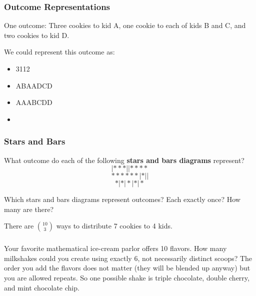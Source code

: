 \documentclass[11pt, compress]{beamer}
\newcommand{\terminology}[1]{\textbf{#1}}
\begin{document}
\begin{frame}
\frametitle{Outcome Representations}
 One outcome: Three cookies to kid A, one cookie to each of kids B and C, and two cookies to kid D.
 
\pause \vfill 

We could represent this outcome as:
\pause 

\begin{itemize}[<+->]
\item{} 3112


\item{} ABAADCD


\item{} AAABCDD


\item{} \textasteriskcentered{}\textasteriskcentered{}\textasteriskcentered{}\textbar{}\textasteriskcentered{}\textbar{}\textasteriskcentered{}\textbar{}\textasteriskcentered{}\textasteriskcentered{}

\end{itemize}

\end{frame}
 
\begin{frame}
\frametitle{Stars and Bars}
 What outcome do each of the following \terminology{stars and bars diagrams} represent?%
\begin{equation*}
|***||****
\end{equation*}
%
\begin{equation*}
******|*||  
\end{equation*}
%
\begin{equation*}
*|*|*|*|*
\end{equation*}

 
\pause \vfill 

Which stars and bars diagrams represent outcomes?  Each exactly once?  How many are there?
 
\pause \vfill 

There are \(\binom{10}{3}\) ways to distribute 7 cookies to 4 kids.
\end{frame}
 
\begin{frame}
\frametitle{}
\begin{example}[1.5.1]Your favorite mathematical ice-cream parlor offers 10 flavors. How many milkshakes could you create using exactly 6, not necessarily distinct scoops? The order you add the flavors does not matter (they will be blended up anyway) but you are allowed repeats. So one possible shake is triple chocolate, double cherry, and mint chocolate chip.
\end{example}
\end{frame}
 
\end{document}
